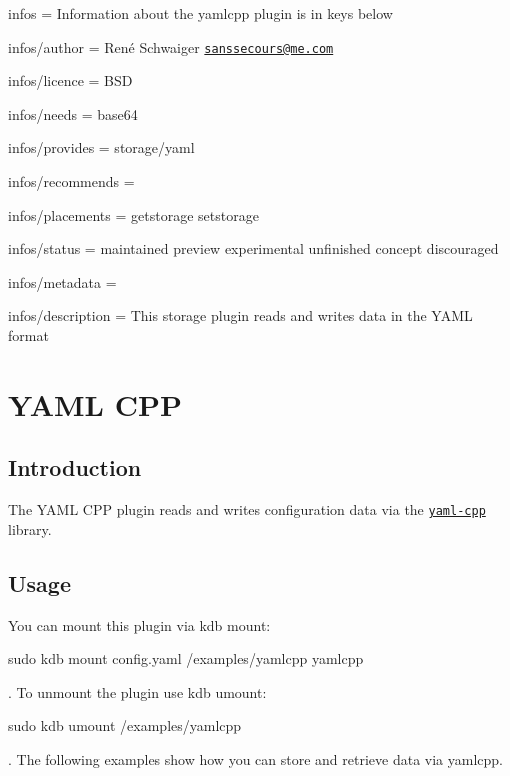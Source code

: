 
\begin{DoxyItemize}
\item infos = Information about the yamlcpp plugin is in keys below
\item infos/author = René Schwaiger \href{mailto:sanssecours@me.com}{\tt sanssecours@me.\+com}
\item infos/licence = B\+SD
\item infos/needs = base64
\item infos/provides = storage/yaml
\item infos/recommends =
\item infos/placements = getstorage setstorage
\item infos/status = maintained preview experimental unfinished concept discouraged
\item infos/metadata =
\item infos/description = This storage plugin reads and writes data in the Y\+A\+ML format
\end{DoxyItemize}\hypertarget{md_src_plugins_yamlcpp_README_src_plugins_yamlcpp_README_md}{}\section{Y\+A\+M\+L C\+PP}\label{md_src_plugins_yamlcpp_README_src_plugins_yamlcpp_README_md}
\subsection*{Introduction}

The Y\+A\+ML C\+PP plugin reads and writes configuration data via the \href{https://github.com/jbeder/yaml-cpp}{\tt yaml-\/cpp} library.

\subsection*{Usage}

You can mount this plugin via {\ttfamily kdb mount}\+:


\begin{DoxyCode}
sudo kdb mount config.yaml /examples/yamlcpp yamlcpp
\end{DoxyCode}


. To unmount the plugin use {\ttfamily kdb umount}\+:


\begin{DoxyCode}
sudo kdb umount /examples/yamlcpp
\end{DoxyCode}


. The following examples show how you can store and retrieve data via {\ttfamily yamlcpp}.

